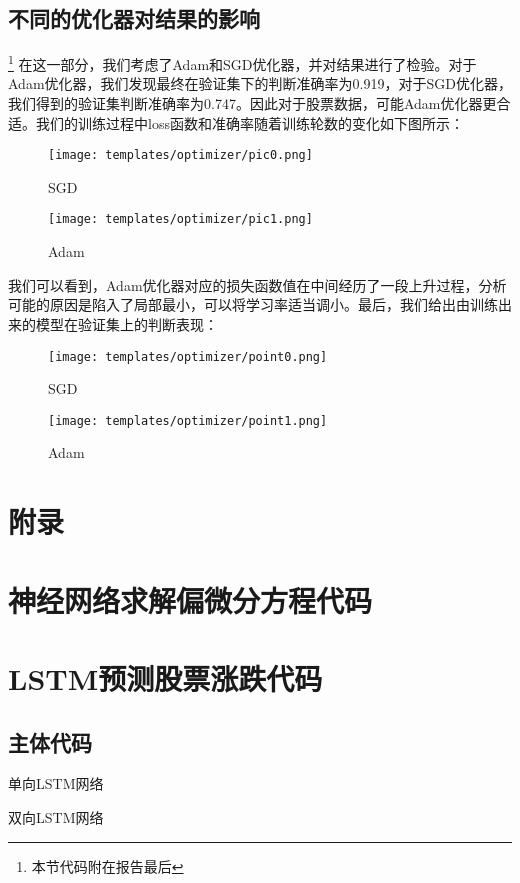 \documentclass[addpoints,answers]{exam}
\begin{document}
\subsection{不同的优化器对结果的影响}\footnote{本节代码附在报告最后}
在这一部分，我们考虑了Adam和SGD优化器，并对结果进行了检验。对于Adam优化器，我们发现最终在验证集下的判断准确率为0.919，对于SGD优化器，我们得到的验证集判断准确率为0.747。因此对于股票数据，可能Adam优化器更合适。我们的训练过程中loss函数和准确率随着训练轮数的变化如下图所示：
\begin{figure}[H]
\centering
\begin{minipage}[t]{0.48\textwidth}
\centering
\texttt{[image: templates/optimizer/pic0.png]}
\caption{SGD}
\end{minipage}
\begin{minipage}[t]{0.48\textwidth}
\centering
\texttt{[image: templates/optimizer/pic1.png]}
\caption{Adam}
\end{minipage}
\end{figure}
我们可以看到，Adam优化器对应的损失函数值在中间经历了一段上升过程，分析可能的原因是陷入了局部最小，可以将学习率适当调小。最后，我们给出由训练出来的模型在验证集上的判断表现：
\begin{figure}[H]
\centering
\begin{minipage}[t]{0.48\textwidth}
\centering
\texttt{[image: templates/optimizer/point0.png]}
\caption{SGD}
\end{minipage}
\begin{minipage}[t]{0.48\textwidth}
\centering
\texttt{[image: templates/optimizer/point1.png]}
\caption{Adam}
\end{minipage}
\end{figure}

\newpage
\section*{附录}
\appendix
\section{神经网络求解偏微分方程代码}
\section{LSTM预测股票涨跌代码}
\subsection{主体代码}
单向LSTM网络

双向LSTM网络

\end{document}
